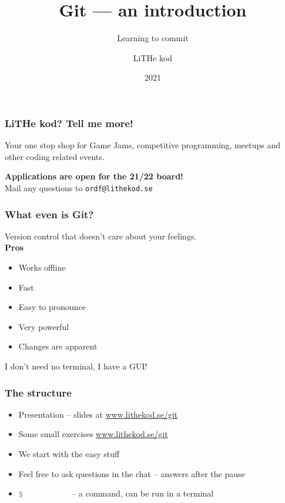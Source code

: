 \documentclass{beamer}
\title[Git]{Git --- an introduction}
\subtitle{Learning to commit}
\author{LiTHe kod}
\date{2021}
\newcommand{\keyword}[1]{\hspace{-1.0em}\textcolor{lkblue}{\textbf{#1}}\vspace{0.2em}} %
\newcommand{\command}[1]{\colorbox{black!78}{\vphantom{Ep}\texttt{\textcolor{gray}{\$}
\textcolor{white}{#1}}}}
\begin{document}
\frame{\titlepage}
\frame{\tableofcontents}


\begin{frame}[fragile]
  \frametitle{LiTHe kod? Tell me more!}
  Your one stop shop for Game Jams, competitive programming, meetups and other coding related events.

  \vspace{2.0em}
  \textbf{Applications are open for the 21/22 board!} \\
  Mail any questions to \texttt{ordf@lithekod.se} \\
\end{frame}

\begin{frame}[fragile]
  \frametitle{What even is Git?}

  Version control that doesn't care about your feelings. \\

  \vspace{1em}
  \keyword{Pros}
  \begin{itemize}
    \item Works offline
    \item Fast
    \item Easy to pronounce
    \item Very powerful
    \item Changes are apparent
  \end{itemize}

\end{frame}

\begin{frame}[fragile]
  \begin{center}
    I don't need no terminal, I have a GUI!
  \end{center}
\end{frame}

\begin{frame}[fragile]
  \frametitle{The structure}
  
  \begin{itemize}[<+->]
    \item Presentation -- slides at \url{www.lithekod.se/git}
    \item Some small exercises \url{www.lithekod.se/git}
    \item We start with the easy stuff
    \item Feel free to ask questions in the chat -- answers after the pause
    \item \command{git status} -- a command, can be run in a terminal
  \end{itemize}

\end{frame}
\end{document}
